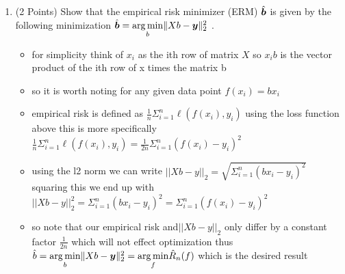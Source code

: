\documentclass{article}
\newcommand{\bb}{b}
\begin{document}
\begin{enumerate}
\setcounter{enumi}{\value{saveenum}}
    \item (2 Points) Show that the empirical risk minimizer (ERM) $\hat{\bs \bb}$ is given by the following minimization $\hat{\bs \bb} = \underset{\bb}{\arg\min}\lVert X\bb - \bs y \Vert_2^2$ .

    \begin{itemize}
        \item for simplicity think of $x_i$ as the ith row of matrix $X$ so $x_i b$ is the vector product of the ith row of x times the matrix b
        \item so it is worth noting for any given data point $f(x_i)=bx_i$
        \item empirical risk is defined as $\frac{1}{n}\Sigma_{i=1}^{n}\ell (f(x_i),y_i)$ using the loss function above this is more specifically $\frac{1}{n}\Sigma_{i=1}^{n}\ell (f(x_i),y_i)=\frac{1}{2n}\Sigma_{i=1}^{n}(f(x_i)-y_i)^2$
        \item using the l2 norm we can write $||Xb-y||_{2}=\sqrt{\Sigma_{i=1}^{n}(bx_i-y_i)^2}$ squaring this we end up with  $||Xb-y||_{2}^{2}=\Sigma_{i=1}^{n}(bx_i-y_i)^2=\Sigma_{i=1}^{n}(f(x_i)-y_i)^2$ 
        \item so note that our empirical risk and$||Xb-y||_{2}$ only differ by a constant factor $\frac{1}{2n}$ which will not effect optimization thus $\hat{b}=\underset{\bb}{\arg\min}\lVert X\bb - \bs y \Vert_2^2=\underset{f}{\arg\min}\hat{R}_{n}(f)$ which is the desired result
    \end{itemize}
    

\end{enumerate}
\end{document}
